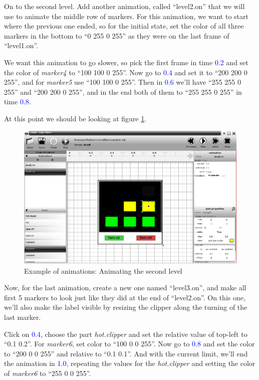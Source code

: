 \documentclass[a4paper]{profusion}
\newcommand{\GUIIcon}[1]{\textcolor{blue}{#1}}    %
\begin{document}
On to the second level. Add another animation, called ``level2.on''
that we will use to animate the middle row of markers. For this
animation, we want to start where the previous one ended, so for the
initial state, set the color of all three markers in the bottom to ``0
255 0 255'' as they were on the last frame of ``level1.on''.

We want this animation to go slower, so pick the first frame in time
\GUIIcon{0.2} and set the color of \emph{marker4} to ``100 100 0 255''.
Now go to \GUIIcon{0.4} and set it to ``200 200 0 255'', and for
\emph{marker5} use ``100 100 0 255''. Then in \GUIIcon{0.6} we'll have
``255 255 0 255'' and ``200 200 0 255'', and in the end both of them
to ``255 255 0 255'' in time \GUIIcon{0.8}.

At this point we should be looking at figure \ref{fig:anim1_level2}.

\begin{figure}[h!]
  \centering
  \includegraphics[width=1.0\textwidth]{examples/anim1_level2.png}
  \caption{Example of animations: Animating the second level}
  \label{fig:anim1_level2}
\end{figure}

Now, for the last animation, create a new one named ``level3.on'', and
make all first 5 markers to look just like they did at the end of
``level2.on''. On this one, we'll also make the label visible by
resizing the clipper along the turning of the last marker.

Click on \GUIIcon{0.4}, choose the part \emph{hot.clipper} and set the
relative value of top-left to ``0.1 0.2''. For \emph{marker6}, set
color to ``100 0 0 255''. Now go to \GUIIcon{0.8} and set the color to
``200 0 0 255'' and relative to ``0.1 0.1''. And with the current
limit, we'll end the animation in \GUIIcon{1.0}, repeating the values
for the \emph{hot.clipper} and setting the color of \emph{marker6} to
``255 0 0 255''.
\end{document}

